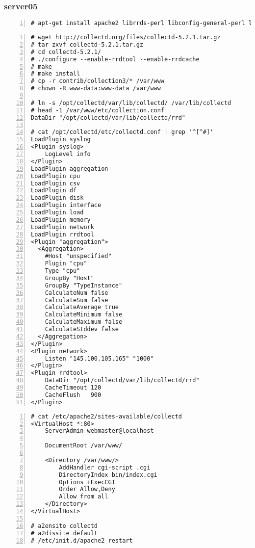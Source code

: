 \documentclass[Configuration]{subfiles}
\begin{document}
\subsubsection{server05}

\begin{lstlisting}[frame=single,caption=Debian packages,backgroundcolor=\color{gray},breaklines=true,numbers=left,]
# apt-get install apache2 librrds-perl libconfig-general-perl libhtml-parser-perl libregexp-common-perl librrd2-dev rrdtool
\end{lstlisting}

\begin{lstlisting}[frame=single,caption=Collectd,backgroundcolor=\color{gray},breaklines=true,numbers=left,]
# wget http://collectd.org/files/collectd-5.2.1.tar.gz
# tar zxvf collectd-5.2.1.tar.gz
# cd collectd-5.2.1/
# ./configure --enable-rrdtool --enable-rrdcache
# make
# make install
# cp -r contrib/collection3/* /var/www
# chown -R www-data:www-data /var/www

# ln -s /opt/collectd/var/lib/collectd/ /var/lib/collectd
# head -1 /var/www/etc/collection.conf 
DataDir "/opt/collectd/var/lib/collectd/rrd"

# cat /opt/collectd/etc/collectd.conf | grep '^[^#]'
LoadPlugin syslog
<Plugin syslog>
    LogLevel info
</Plugin>
LoadPlugin aggregation
LoadPlugin cpu
LoadPlugin csv
LoadPlugin df
LoadPlugin disk
LoadPlugin interface
LoadPlugin load
LoadPlugin memory
LoadPlugin network
LoadPlugin rrdtool
<Plugin "aggregation">
  <Aggregation>
    #Host "unspecified"
    Plugin "cpu"
    Type "cpu"
    GroupBy "Host"
    GroupBy "TypeInstance"
    CalculateNum false
    CalculateSum false
    CalculateAverage true
    CalculateMinimum false
    CalculateMaximum false
    CalculateStddev false
  </Aggregation>
</Plugin>
<Plugin network>
    Listen "145.100.105.165" "1000"
</Plugin>
<Plugin rrdtool>
    DataDir "/opt/collectd/var/lib/collectd/rrd"
    CacheTimeout 120
    CacheFlush   900
</Plugin>
\end{lstlisting}

\begin{lstlisting}[frame=single,caption=Apache,backgroundcolor=\color{gray},breaklines=true,numbers=left,]
# cat /etc/apache2/sites-available/collectd 
<VirtualHost *:80>
    ServerAdmin webmaster@localhost

    DocumentRoot /var/www/

    <Directory /var/www/>
        AddHandler cgi-script .cgi
        DirectoryIndex bin/index.cgi
        Options +ExecCGI
        Order Allow,Deny
        Allow from all
    </Directory>
</VirtualHost> 

# a2ensite collectd
# a2dissite default
# /etc/init.d/apache2 restart
\end{lstlisting}
\end{document}
